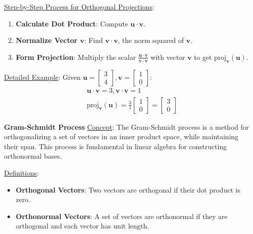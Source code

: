 \documentclass[8pt, a4paper, landscape]{extarticle} %
\begin{document}
\begin{multicols*}{4}
  \underline{Step-by-Step Process for Orthogonal Projections}:
  \begin{enumerate}
    \item \textbf{Calculate Dot Product}: Compute \(\mathbf{u} \cdot \mathbf{v}\).
    \item \textbf{Normalize Vector \(\mathbf{v}\)}: Find \(\mathbf{v} \cdot \mathbf{v}\), the norm squared of \(\mathbf{v}\).
    \item \textbf{Form Projection}: Multiply the scalar \(\frac{\mathbf{u} \cdot \mathbf{v}}{\mathbf{v} \cdot \mathbf{v}}\) with vector \(\mathbf{v}\) to get \(\text{proj}_{\mathbf{v}}(\mathbf{u})\).
  \end{enumerate}

  \underline{Detailed Example}:
  Given \( \mathbf{u} = \begin{bmatrix} 3 \\ 4 \end{bmatrix}, \mathbf{v} = \begin{bmatrix} 1 \\ 0 \end{bmatrix} \):
  \[
    \begin{aligned}
       & \mathbf{u} \cdot \mathbf{v} = 3, \mathbf{v} \cdot \mathbf{v} = 1                                                               \\
       & \text{proj}_{\mathbf{v}}(\mathbf{u}) = \frac{3}{1} \begin{bmatrix} 1 \\ 0 \end{bmatrix} = \begin{bmatrix} 3 \\ 0 \end{bmatrix}
    \end{aligned}
  \]


  \textbf{Gram-Schmidt Process}
  \underline{Concept}: The Gram-Schmidt process is a method for orthogonalizing a set of vectors in an inner product space, while maintaining their span. This process is fundamental in linear algebra for constructing orthonormal bases.

  \underline{Definitions}:
  \begin{itemize}
    \item \textbf{Orthogonal Vectors}: Two vectors are orthogonal if their dot product is zero.
    \item \textbf{Orthonormal Vectors}: A set of vectors are orthonormal if they are orthogonal and each vector has unit length.
  \end{itemize}


\end{multicols*}
\end{document}
